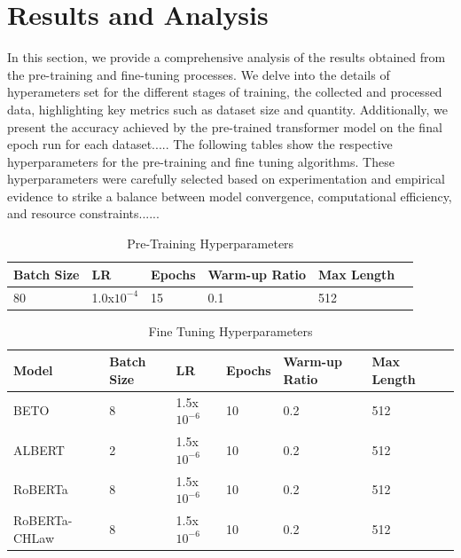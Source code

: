 \chapter{Results and Analysis}
\label{ch:resultados} %


In this section, we provide a comprehensive analysis of the results obtained from the pre-training and fine-tuning processes. We delve into the details of hyperameters set for the different stages of training, the collected and processed data, highlighting key metrics such as dataset size and quantity. Additionally, we present the accuracy achieved by the pre-trained transformer model on the final epoch run for each dataset..... 
The following tables show the respective hyperparameters for the pre-training and fine tuning algorithms. These hyperparameters were carefully selected based on experimentation and empirical evidence to strike a balance between model convergence, computational efficiency, and resource constraints......
\begin{table}[H]
\label{tab:Pre-Training HyperParameters}
\centering
\begin{tabular}{|l|l|l|l|l|l|}
\hline
Batch Size & LR & Epochs & Warm-up Ratio & Max Length \\ \hline
80         &    1.0x$10^{-4}$    &  15   & 0.1  & 512   \\ \hline
\end{tabular}
\caption{Pre-Training Hyperparameters}
\end{table}


\vspace{0.5cm}


\begin{table}[H]
\label{tab:Fine Tuning HyperParameters}
\centering
\begin{tabular}{|l|l|l|l|l|l|l|}
\hline
Model & Batch Size & LR & Epochs & Warm-up Ratio & Max Length \\ \hline
BETO & 8   &   1.5x$10^{-6}$    &  10   & 0.2  & 512 \\ \hline
ALBERT & 2   &   1.5x$10^{-6}$    &  10   & 0.2  & 512 \\ \hline
RoBERTa & 8   &   1.5x$10^{-6}$    &  10   & 0.2  & 512   \\ \hline
RoBERTa-CHLaw & 8   &   1.5x$10^{-6}$    &  10   & 0.2  & 512  \\ \hline
\end{tabular}
\caption{Fine Tuning Hyperparameters}
\end{table}

